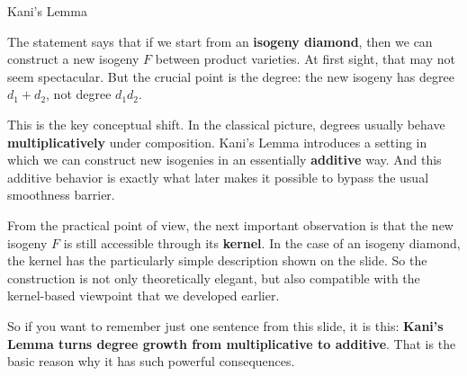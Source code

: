 \documentclass[aspectratio=169,notheorems]{beamer}
\begin{document}
\begin{frame}{Kani's Lemma}
{			The statement says that if we start from an \textbf{isogeny diamond}, then we can construct a new isogeny \(F\) between product varieties. At first sight, that may not seem spectacular. But the crucial point is the degree: the new isogeny has degree \textbf{\(d_1 + d_2\)}, not degree \(d_1 d_2\).
			
			This is the key conceptual shift. In the classical picture, degrees usually behave \textbf{multiplicatively} under composition. Kani's Lemma introduces a setting in which we can construct new isogenies in an essentially \textbf{additive} way. And this additive behavior is exactly what later makes it possible to bypass the usual smoothness barrier.
			
			From the practical point of view, the next important observation is that the new isogeny \(F\) is still accessible through its \textbf{kernel}. In the case of an isogeny diamond, the kernel has the particularly simple description shown on the slide. So the construction is not only theoretically elegant, but also compatible with the kernel-based viewpoint that we developed earlier.
			
			So if you want to remember just one sentence from this slide, it is this: \textbf{Kani's Lemma turns degree growth from multiplicative to additive}. That is the basic reason why it has such powerful consequences.
		}
	\end{frame}
	
	
	
\end{document}
